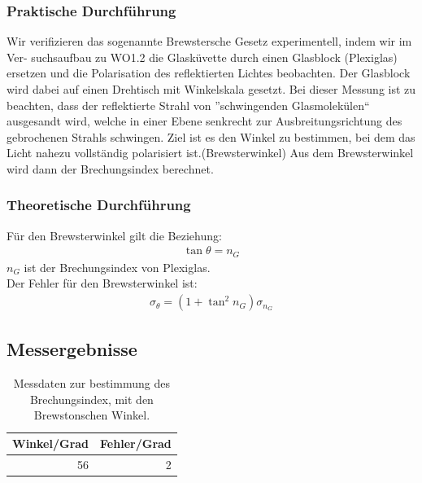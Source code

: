 \documentclass[12pt]{scrartcl}
\begin{document}
\subsubsection{Praktische Durchführung}
Wir verifizieren das sogenannte Brewstersche Gesetz experimentell, indem wir im Ver-
suchsaufbau zu WO1.2 die Glasküvette durch einen Glasblock (Plexiglas) ersetzen und
die Polarisation des reflektierten Lichtes beobachten.
Der Glasblock wird dabei auf einen Drehtisch mit Winkelskala gesetzt.
Bei dieser Messung ist zu beachten, dass der reflektierte Strahl von ”schwingenden Glasmolekülen“ ausgesandt wird, welche in einer Ebene
senkrecht zur Ausbreitungsrichtung des gebrochenen Strahls schwingen.
Ziel ist es den Winkel zu bestimmen, bei dem das Licht nahezu vollständig polarisiert ist.(Brewsterwinkel)
Aus dem Brewsterwinkel wird dann %
der Brechungsindex berechnet.
\subsubsection{Theoretische Durchführung}
Für den Brewsterwinkel gilt die Beziehung:
\begin{align}
\tan{\theta} = n_G
\end{align}
$n_G$ ist der Brechungsindex von Plexiglas.\\
Der Fehler für den Brewsterwinkel ist:
\begin{align}
\sigma_\theta = (1+\tan^2{n_G})\sigma_{n_G}
\end{align}
\subsection{Messergebnisse}
\begin{table}[htbp]
\caption{Messdaten zur bestimmung des Brechungsindex, mit den Brewstonschen Winkel.}
\begin{center}
\begin{tabular}{|l|l|}
\hline
Winkel/Grad & Fehler/Grad \\ \hline
\multicolumn{1}{|r|}{56} & \multicolumn{1}{r|}{2} \\ \hline
\end{tabular}
\end{center}
\label{tab:a_4}
\end{table}
\end{document}
